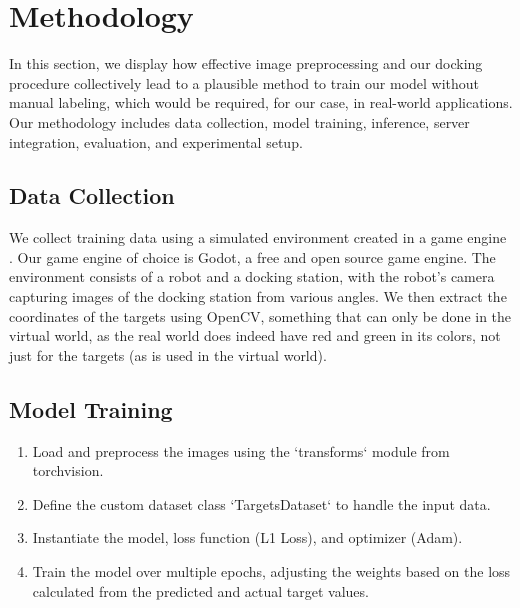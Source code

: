 \section{Methodology}
In this section, we display how effective image preprocessing and our docking procedure collectively lead to a plausible method to train our model without manual labeling, which would be required, for our case, in real-world applications. Our methodology includes data collection, model training, inference, server integration, evaluation, and experimental setup.

\subsection{Data Collection}
We collect training data using a simulated environment created in a game engine \citep{hoster2024usinggameenginesmachine}. Our game engine of choice is Godot, a free and open source game engine. The environment consists of a robot and a docking station, with the robot's camera capturing images of the docking station from various angles. We then extract the coordinates of the targets using OpenCV, something that can only be done in the virtual world, as the real world does indeed have red and green in its colors, not just for the targets (as is used in the virtual world).


\subsection{Model Training}
\begin{enumerate}
    \item Load and preprocess the images using the `transforms` module from torchvision.
    \item Define the custom dataset class `TargetsDataset` to handle the input data.
    \item Instantiate the model, loss function (L1 Loss), and optimizer (Adam).
    \item Train the model over multiple epochs, adjusting the weights based on the loss calculated from the predicted and actual target values.
\end{enumerate}

